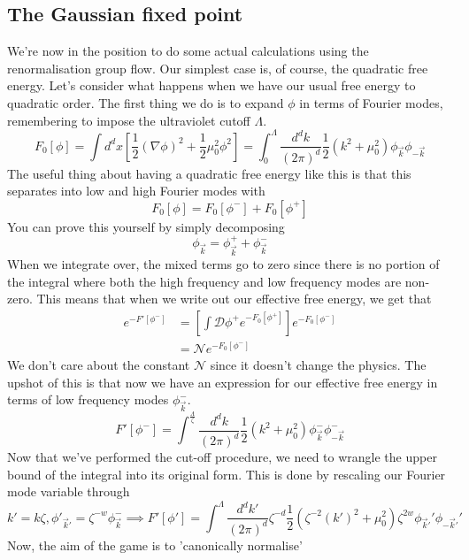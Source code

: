 \subsection{The Gaussian fixed point} 
We're now in the position 
to do some actual calculations using 
the renormalisation group flow. 
Our simplest case is, of course, 
the quadratic free energy. Let's consider what happens 
when we have our usual free energy to quadratic order. 
The first thing we do is to expand $ \phi $ in terms 
of Fourier modes, remembering to impose 
the ultraviolet cutoff $ \Lambda $. 
\[
	F _ 0 [ \phi ] = \int d^ d x \left[  \frac{1}{2 } ( \nabla \phi ) ^ 2 + \frac{1}{2 } \mu _ 0 ^ 2 \phi ^ 2 \right] = \int_ 0 ^ \Lambda \frac{ d^ d k }{ ( 2 \pi ) ^ d } \frac{1}{2 } \left(  k ^ 2 + \mu_ 0 ^ 2   \right)  \phi 
	_{ \vec{k} } \phi _{ - \vec{k}}
\] The useful thing about having 
a quadratic free energy like this 
is that this separates into low and high 
Fourier modes with 
\[
	F _ 0 [ \phi ] = F_0 [ \phi ^ - ] + F _ 0 [ \phi ^ + ] 
\] You can prove this yourself 
by simply decomposing
\[
 \phi _{ \vec{k} } = \phi_{ \vec{k} } ^ + + \phi _{ \vec{k} } ^ - 
\]   
When we integrate over, the mixed terms go to zero since
there is no portion of the integral where both the high 
frequency and low frequency modes are non-zero. 
This means that when we write out 
our effective free energy, we get that 
\begin{align*}
e ^{  - F ' [ \phi ^ - ] } &= \left[  \int \mathcal{ D } \phi ^+ e ^{  - F _ 0 [ \phi ^ +  ] }\right] e^{  - F_0 [ \phi ^ -  ] }    \\
			   &=  \mathcal{ N } e ^{  - F_ 0 [ \phi ^ - ] } 
\end{align*} We don't
care about the constant $ \mathcal{ N } $ since it 
doesn't change the physics. The upshot 
of this is that now we have an expression for 
our effective free energy in terms of low frequency modes
$ \phi _{ \vec{k} } ^ - $. 
\[
F' [ \phi ^ - ] = \int ^ \frac{ \Lambda }{ \zeta } 
\frac{ d ^ d k  }{ ( 2 \pi ) ^ d   } \frac{1}{2 } 
( k ^ 2 + \mu _ 0 ^ 2 ) \phi _{ \vec{k} } ^ - \phi _{ -\vec{k} } ^ - 
\]  Now that we've performed the cut-off 
procedure, we need to wrangle the upper bound of the integral 
into its original form. This is done by rescaling 
our Fourier mode variable through 
\[
k ' = k\zeta , \phi'_{ \vec{k} ' } =  \zeta^{ - w } \phi _{\vec{k} } ^ -   \implies 
F' [ \phi ' ] = \int ^ \Lambda \frac{ d ^ d k ' }{ ( 2 \pi ) ^ d } 
\zeta ^{ - d  } \frac{1}{2 } ( \zeta ^{ -2 } ( k ')  ^ 2  + \mu _ 0 ^ 2 ) 
\zeta ^{ 2 w } \phi_{\vec{k} ' } ' \phi _{  - \vec{k}  ' } ' 
\] Now, the aim of the game is to 'canonically normalise' 
